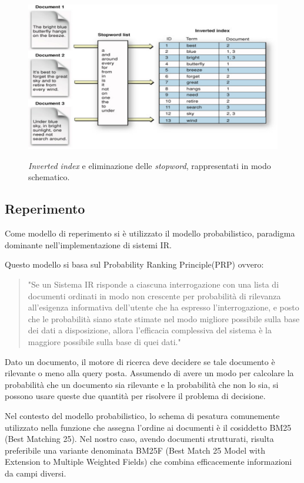 \documentclass[runningheads]{llncs}
\begin{document}
\begin{figure}%
    \centering
    {{\includegraphics[width=0.8\linewidth]{inverted_index} }}%
    \caption{\emph{Inverted index} e eliminazione delle \emph{stopword}, rappresentati in modo schematico.}%
\end{figure}

\subsection{Reperimento}
Come modello di reperimento si \`e utilizzato il modello probabilistico, paradigma dominante nell'implementazione di sistemi IR.

Questo modello si basa sul Probability Ranking Principle(PRP)\cite{PRP} ovvero:

\blockquote{"Se un Sistema IR risponde a ciascuna interrogazione con una lista di documenti ordinati in
modo non crescente per probabilit\`a di rilevanza all'esigenza informativa dell'utente che ha espresso l'interrogazione,
e posto che le probabilit\`a siano state stimate nel modo migliore possibile sulla base dei dati a disposizione, allora
l'efficacia complessiva del sistema \`e la maggiore possibile sulla base di quei dati."}

Dato un documento, il motore di ricerca deve decidere se tale documento \`e rilevante o meno alla query posta.
Assumendo di avere un modo per calcolare la probabilit\`a che un documento sia rilevante e la probabilit\`a che non lo sia,
si possono usare queste due quantit\`a per risolvere il problema di decisione.


Nel contesto del modello probabilistico, lo schema di pesatura comunemente utilizzato nella funzione che assegna l'ordine ai documenti \`e il cosiddetto BM25\cite{WBC} (Best Matching 25).
Nel nostro caso, avendo documenti strutturati, risulta preferibile una variante denominata BM25F (Best Match 25 Model with Extension to Multiple Weighted Fields) 
che combina efficacemente informazioni da campi diversi.
\end{document}
